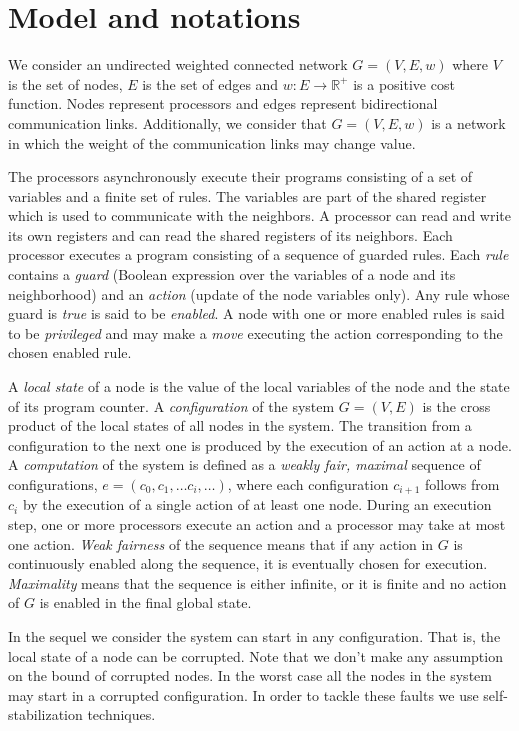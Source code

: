 \documentclass[11pt,a4paper]{article}
\begin{document}
\section{Model and notations} 
\label{sec:model}




We consider an undirected weighted connected network $G=(V,E,w)$ where $V$ is the set of nodes, $E$ is the set of edges and $w: E \rightarrow {\mathbb R^+}$ is a positive cost function. 
Nodes represent processors and edges represent bidirectional communication links. Additionally, we consider that $G=(V,E,w)$ is a network in which the weight of the communication links may change value. 


The processors asynchronously execute their programs consisting of a set of variables and a finite set of rules. The variables are part of the shared register which is used to communicate with the neighbors. A processor can read and write its own registers and can read the shared registers of its neighbors. 
Each processor executes a program consisting of a sequence of guarded rules. Each \emph{rule} contains a \emph{guard} (Boolean expression over the variables of a node and its neighborhood) and an \emph{action} (update of the node variables only). Any rule whose guard is \emph{true} is said to be \emph{enabled}. A node with one or more enabled rules is said to be \emph{privileged} and may make a \emph{move} executing the action corresponding to the chosen enabled rule.

A {\it local state} of a node is the value of the local variables of the node and the state of its program counter. A {\it configuration} of the system $G=(V,E)$ is the cross product of the local states of all nodes in the system. The transition from a configuration to the next one is produced by the execution of an action at a node. A {\it computation} of the system is defined as a \emph{weakly fair, maximal} sequence of configurations, $e=(c_0, c_1, \ldots c_i, \ldots)$, where each configuration $c_{i+1}$ follows from $c_i$ by the execution of a single action of at least one node. During an execution step, one or more processors execute an action and a processor may take at most one action. \emph{Weak fairness} of the sequence means that if any action in $G$ is continuously enabled along the sequence, it is eventually chosen for execution. \emph{Maximality} means that the sequence is either infinite, or it is finite and no action of $G$ is enabled in the final global state.

In the sequel we consider the system can start in any configuration. That is, the local state of a node can be corrupted. Note that we don't make any assumption on the bound of corrupted nodes. In the worst case all the nodes in the system may start in a corrupted configuration. In order to tackle these faults we use self-stabilization techniques.
\end{document}
